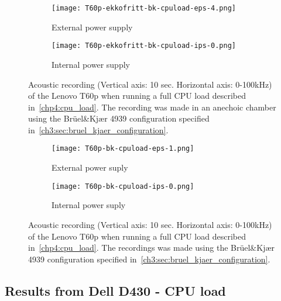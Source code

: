 \begin{figure}[ht]
	\begin{subfigure}{0.8\textwidth}
	    \centering
	    \texttt{[image: T60p-ekkofritt-bk-cpuload-eps-4.png]}
	    \caption{External power supply}
	    \label{fig:T60p-ekkofritt-bk-cpuload-eps-4}
    \end{subfigure}
    \begin{subfigure}{0.8\textwidth}
	    \centering
	    \texttt{[image: T60p-ekkofritt-bk-cpuload-ips-0.png]}
	    \caption{Internal power supply}
	    \label{fig:T60p-ekkofritt-bk-cpuload-ips-0}
    \end{subfigure}
    \caption{Acoustic recording (Vertical axis: 10 sec. Horizontal axis: 0-100kHz) of the Lenovo T60p when running a full CPU load described in~\autoref{chp4:cpu_load}. The recording was made in an anechoic chamber using the Brüel\&Kjær 4939 configuration specified in~\autoref{ch3:sec:bruel_kjaer_configuration}.}
	\label{fig:T60p-ekkofritt-bk-cpuload}
\end{figure}

\begin{figure}[ht]
	\begin{subfigure}{0.8\textwidth}
	    \centering
	    \texttt{[image: T60p-bk-cpuload-eps-1.png]}
	    \caption{External power suply}
	    \label{fig:T60p-bk-cpuload-eps-1-1a}
    \end{subfigure}
    \begin{subfigure}{0.8\textwidth}
	    \centering
	    \texttt{[image: T60p-bk-cpuload-ips-0.png]}
	    \caption{Internal power suply}
	    \label{fig:T60p-bk-cpuload-ips-0-1b}
    \end{subfigure}
    \caption{Acoustic recording (Vertical axis: 10 sec. Horizontal axis: 0-100kHz) of the Lenovo T60p when running a full CPU load described in~\autoref{chp4:cpu_load}. The recordings was made using the Brüel\&Kjær 4939 configuration specified in~\autoref{ch3:sec:bruel_kjaer_configuration}. }
	\label{fig:T60p-bk-cpuload}
\end{figure}


\subsection{Results from Dell D430 - CPU load}\label{subsec:d430_bk_results_cpuload}

